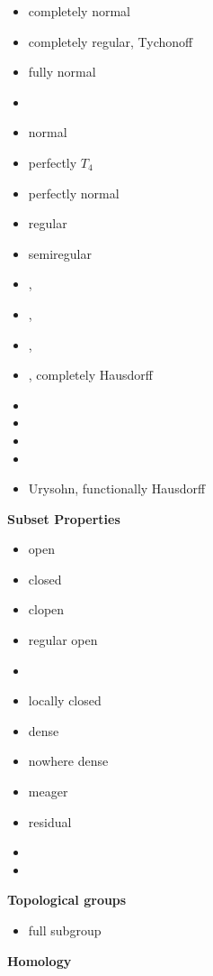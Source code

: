 \documentclass[12pt]{article}
\begin{document}
\centerline{}
\begin{itemize}
\item completely normal
\item completely regular, Tychonoff
\item fully normal
\item {}
\item normal
\item perfectly $T_4$
\item perfectly normal
\item regular
\item semiregular
\item {}, 
\item {}, 
\item {}, 
\item {}, completely Hausdorff
\item {}
\item {}
\item {}
\item {}
\item Urysohn, functionally Hausdorff
\end{itemize}

\centerline{\bf Subset Properties}
\begin{itemize}
\item open
\item closed
\item clopen
\item regular open
\item {}
\item locally closed
\item dense
\item nowhere dense
\item meager
\item residual
\item {}
\item {}
\end{itemize}

\centerline{\bf Topological groups}
\begin{itemize}
\item full subgroup
\end{itemize}


\centerline{\bf Homology}
\end{document}
